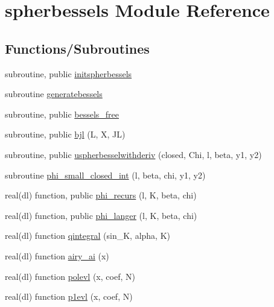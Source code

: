 \hypertarget{namespacespherbessels}{}\section{spherbessels Module Reference}
\label{namespacespherbessels}
\subsection*{Functions/\+Subroutines}
\begin{DoxyCompactItemize}
\item 
subroutine, public \mbox{\hyperlink{namespacespherbessels_ab479fd257b8fa714e8a3522ab65e11af}{initspherbessels}}
\item 
subroutine \mbox{\hyperlink{namespacespherbessels_a94dad04f4df289878f0e038437916427}{generatebessels}}
\item 
subroutine, public \mbox{\hyperlink{namespacespherbessels_a0abb3ebb234b8547151b14c0cdb439be}{bessels\+\_\+free}}
\item 
subroutine, public \mbox{\hyperlink{namespacespherbessels_a1619c25c91b245252b30a3da4d640050}{bjl}} (L, X, JL)
\item 
subroutine, public \mbox{\hyperlink{namespacespherbessels_a19f6db59afef649058999b63f9ab8f65}{uspherbesselwithderiv}} (closed, Chi, l, beta, y1, y2)
\item 
subroutine \mbox{\hyperlink{namespacespherbessels_a0d5dede9bff52decb1e7fb2d2df35d3a}{phi\+\_\+small\+\_\+closed\+\_\+int}} (l, beta, chi, y1, y2)
\item 
real(dl) function, public \mbox{\hyperlink{namespacespherbessels_ac2bed68bb6862f56c27d5a5cfc5fd94d}{phi\+\_\+recurs}} (l, K, beta, chi)
\item 
real(dl) function, public \mbox{\hyperlink{namespacespherbessels_ac93cf86caa7e4d63b164799492196aba}{phi\+\_\+langer}} (l, K, beta, chi)
\item 
real(dl) function \mbox{\hyperlink{namespacespherbessels_ae89051535f9e9606be1ab046f5a77854}{qintegral}} (sin\+\_\+K, alpha, K)
\item 
real(dl) function \mbox{\hyperlink{namespacespherbessels_a4a053c46f90faa3400f9619fc31cbd1d}{airy\+\_\+ai}} (x)
\item 
real(dl) function \mbox{\hyperlink{namespacespherbessels_afef9b0d68efd18edac5580591a39f7ba}{polevl}} (x, coef, N)
\item 
real(dl) function \mbox{\hyperlink{namespacespherbessels_a193e3d6761bf168624e2532123ccec2b}{p1evl}} (x, coef, N)
\end{DoxyCompactItemize}
